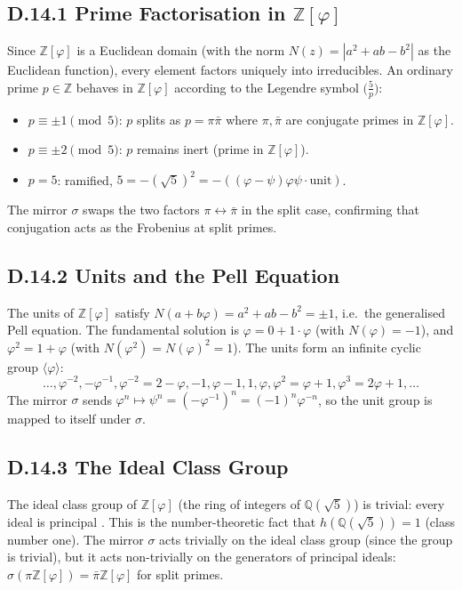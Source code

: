 \subsection*{D.14.1  Prime Factorisation in $\mathbb{Z}[\varphi]$}

Since $\mathbb{Z}[\varphi]$ is a Euclidean domain (with the norm $N(z) = |a^2+ab-b^2|$
as the Euclidean function), every element factors uniquely into irreducibles.
An ordinary prime $p\in\mathbb{Z}$ behaves in $\mathbb{Z}[\varphi]$ according to
the Legendre symbol $\bigl(\frac{5}{p}\bigr)$:
\begin{itemize}
  \item $p \equiv \pm 1 \pmod{5}$: $p$ splits as $p = \pi\bar\pi$ where
    $\pi, \bar\pi$ are conjugate primes in $\mathbb{Z}[\varphi]$.
  \item $p \equiv \pm 2 \pmod{5}$: $p$ remains inert (prime in $\mathbb{Z}[\varphi]$).
  \item $p = 5$: ramified, $5 = -(\sqrt5)^2 = -((\varphi-\psi)\varphi\psi \cdot \text{unit})$.
\end{itemize}
The mirror $\sigma$ swaps the two factors $\pi \leftrightarrow \bar\pi$ in the
split case, confirming that conjugation acts as the Frobenius at split primes.

\subsection*{D.14.2  Units and the Pell Equation}

The units of $\mathbb{Z}[\varphi]$ satisfy $N(a+b\varphi) = a^2+ab-b^2 = \pm 1$,
i.e.\ the generalised Pell equation.
The fundamental solution is $\varphi = 0 + 1\cdot\varphi$ (with $N(\varphi) = -1$),
and $\varphi^2 = 1+\varphi$ (with $N(\varphi^2) = N(\varphi)^2 = 1$).
The units form an infinite cyclic group $\langle \varphi \rangle$:
\[
  \ldots, \varphi^{-2}, -\varphi^{-1}, \varphi^{-2}=2-\varphi, -1, \varphi-1,
    1, \varphi, \varphi^2=\varphi+1, \varphi^3=2\varphi+1, \ldots
\]
The mirror $\sigma$ sends $\varphi^n \mapsto \psi^n = (-\varphi^{-1})^n = (-1)^n\varphi^{-n}$,
so the unit group is mapped to itself under $\sigma$.

\subsection*{D.14.3  The Ideal Class Group}

The ideal class group of $\mathbb{Z}[\varphi]$ (the ring of integers of
$\mathbb{Q}(\sqrt5)$) is trivial: every ideal is principal
\cite{coxeter_regular_polytopes}.  This is the number-theoretic fact that
$h(\mathbb{Q}(\sqrt5)) = 1$ (class number one).
The mirror $\sigma$ acts trivially on the ideal class group (since the group
is trivial), but it acts non-trivially on the generators of principal ideals:
$\sigma(\pi\mathbb{Z}[\varphi]) = \bar\pi\mathbb{Z}[\varphi]$ for split primes.


